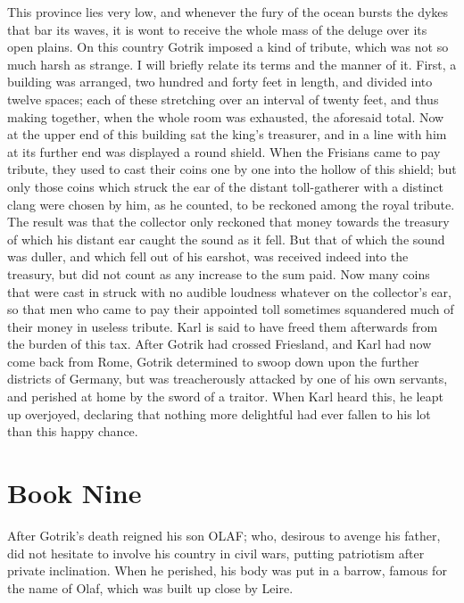 \documentclass[10pt,a4paper]{report}
\begin{document}
This province lies very low, and whenever the fury of the ocean bursts the dykes that bar its waves, it is wont to receive the whole mass of the deluge over its open plains. On this country Gotrik imposed a kind of tribute, which was not so much harsh as strange. I will briefly relate its terms and the manner of it. First, a building was arranged, two hundred and forty feet in length, and divided into twelve spaces; each of these stretching over an interval of twenty feet, and thus making together, when the whole room was exhausted, the aforesaid total. Now at the upper end of this building sat the king's treasurer, and in a line with him at its further end was displayed a round shield. When the Frisians came to pay tribute, they used to cast their coins one by one into the hollow of this shield; but only those coins which struck the ear of the distant toll-gatherer with a distinct clang were chosen by him, as he counted, to be reckoned among the royal tribute. The result was that the collector only reckoned that money towards the treasury of which his distant ear caught the sound as it fell. But that of which the sound was duller, and which fell out of his earshot, was received indeed into the treasury, but did not count as any increase to the sum paid. Now many coins that were cast in struck with no audible loudness whatever on the collector's ear, so that men who came to pay their appointed toll sometimes squandered much of their money in useless tribute. Karl is said to have freed them afterwards from the burden of this tax. After Gotrik had crossed Friesland, and Karl had now come back from Rome, Gotrik determined to swoop down upon the further districts of Germany, but was treacherously attacked by one of his own servants, and perished at home by the sword of a traitor. When Karl heard this, he leapt up overjoyed, declaring that nothing more delightful had ever fallen to his lot than this happy chance.\\


\chapter{Book Nine}

After Gotrik's death reigned his son OLAF; who, desirous to avenge his father, did not hesitate to involve his country in civil wars, putting patriotism after private inclination. When he perished, his body was put in a barrow, famous for the name of Olaf, which was built up close by Leire.\\
\end{document}
